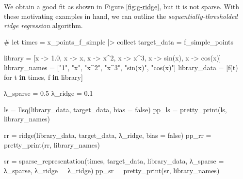 \documentclass[
]{article}
\newenvironment{Shaded}{\begin{snugshade}}{\end{snugshade}}
\newcommand{\CommentTok}[1]{\textcolor[rgb]{0.37,0.37,0.37}{#1}}
\newcommand{\ConstantTok}[1]{\textcolor[rgb]{0.56,0.35,0.01}{#1}}
\newcommand{\FloatTok}[1]{\textcolor[rgb]{0.68,0.00,0.00}{#1}}
\newcommand{\FunctionTok}[1]{\textcolor[rgb]{0.28,0.35,0.67}{#1}}
\newcommand{\KeywordTok}[1]{\textcolor[rgb]{0.00,0.23,0.31}{\textbf{#1}}}
\newcommand{\NormalTok}[1]{\textcolor[rgb]{0.00,0.23,0.31}{#1}}
\newcommand{\OperatorTok}[1]{\textcolor[rgb]{0.37,0.37,0.37}{#1}}
\newcommand{\StringTok}[1]{\textcolor[rgb]{0.13,0.47,0.30}{#1}}
\begin{document}
We obtain a good fit as shown in Figure \ref{fig:g-ridge}, but it is not
sparse. With these motivating examples in hand, we can outline the
\emph{sequentially-thresholded ridge regression} algorithm.

\clearpage

\begin{Shaded}
\begin{Highlighting}[]
\CommentTok{\# let}
\NormalTok{times }\OperatorTok{=}\NormalTok{ x\_points\_f\_simple }\OperatorTok{|\textgreater{}}\NormalTok{ collect}
\NormalTok{target\_data }\OperatorTok{=}\NormalTok{ f\_simple\_points}

\NormalTok{library }\OperatorTok{=}\NormalTok{ [x }\OperatorTok{{-}\textgreater{}} \FloatTok{1.0}\NormalTok{, x }\OperatorTok{{-}\textgreater{}}\NormalTok{ x, x }\OperatorTok{{-}\textgreater{}}\NormalTok{ x}\OperatorTok{\^{}}\FloatTok{2}\NormalTok{, x }\OperatorTok{{-}\textgreater{}}\NormalTok{ x}\OperatorTok{\^{}}\FloatTok{3}\NormalTok{, x }\OperatorTok{{-}\textgreater{}} \FunctionTok{sin}\NormalTok{(x), x }\OperatorTok{{-}\textgreater{}} \FunctionTok{cos}\NormalTok{(x)]}
\NormalTok{library\_names }\OperatorTok{=}\NormalTok{ [}\StringTok{"1"}\NormalTok{, }\StringTok{"x"}\NormalTok{, }\StringTok{"x\^{}2"}\NormalTok{, }\StringTok{"x\^{}3"}\NormalTok{, }\StringTok{"sin(x)"}\NormalTok{, }\StringTok{"cos(x)"}\NormalTok{]}
\NormalTok{library\_data }\OperatorTok{=}\NormalTok{ [}\FunctionTok{f}\NormalTok{(t) for t }\KeywordTok{in}\NormalTok{ times, f }\KeywordTok{in}\NormalTok{ library]}

\NormalTok{λ\_sparse }\OperatorTok{=} \FloatTok{0.5}
\NormalTok{λ\_ridge }\OperatorTok{=} \FloatTok{0.1}

\NormalTok{ls }\OperatorTok{=} \FunctionTok{llsq}\NormalTok{(library\_data, target\_data, bias }\OperatorTok{=} \ConstantTok{false}\NormalTok{)}
\NormalTok{pp\_ls }\OperatorTok{=} \FunctionTok{pretty\_print}\NormalTok{(ls, library\_names)}

\NormalTok{rr }\OperatorTok{=} \FunctionTok{ridge}\NormalTok{(library\_data, target\_data, λ\_ridge, bias }\OperatorTok{=} \ConstantTok{false}\NormalTok{)}
\NormalTok{pp\_rr }\OperatorTok{=} \FunctionTok{pretty\_print}\NormalTok{(rr, library\_names)}

\NormalTok{sr }\OperatorTok{=} \FunctionTok{sparse\_representation}\NormalTok{(times, target\_data, library\_data, λ\_sparse }\OperatorTok{=}\NormalTok{ λ\_sparse, λ\_ridge }\OperatorTok{=}\NormalTok{ λ\_ridge)}
\NormalTok{pp\_sr }\OperatorTok{=} \FunctionTok{pretty\_print}\NormalTok{(sr, library\_names)}


\end{Highlighting}
\end{Shaded}
\end{document}
